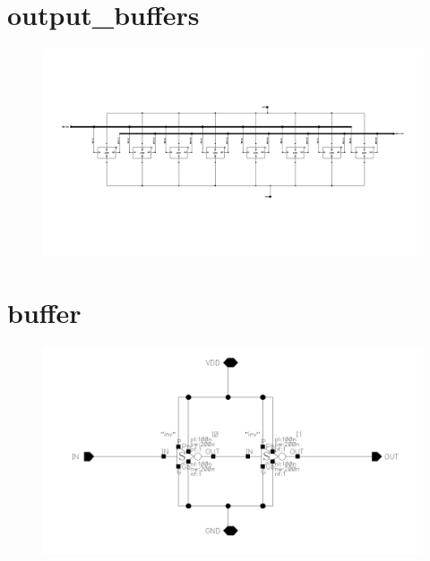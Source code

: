 \documentclass[english, 12pt, a4paper]{ifimaster}
\begin{document}
\begin{appendices}
\section{output\_buffers}
\begin{figure}[!ht]
 \centering
 \includegraphics[width=20cm, angle=90]{img/output_buffers}
 \label{app:buff:out}
\end{figure}

\newpage
\section{buffer}
\begin{figure}[!ht]
 \centering
 \includegraphics[width=20cm, angle=90]{img/buffer}
 \label{app:buff}
\end{figure}
\newpage


\end{appendices}
\end{document}
